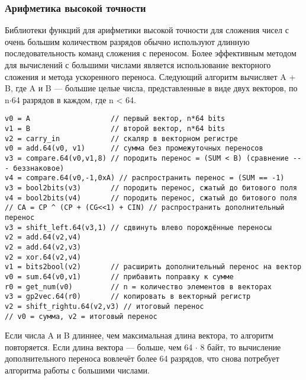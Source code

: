 \documentclass[forwardcom.tex]{subfiles}
\begin{document}
\subsubsection{Арифметика высокой точности} \label{highPrecisionArithmetic}
Библиотеки функций для арифметики высокой точности для сложения чисел с очень большим количеством разрядов обычно используют длинную последовательность команд сложения с переносом. Более эффективным методом для вычислений с большими числами является использование векторного сложения и метода ускоренного переноса. Следующий алгоритм вычисляет A + B, где A и B --- большие целые числа, представленные в виде двух векторов, по n$\cdot$64 разрядов в каждом, где n \textless{} 64.
\begin{verbatim}
v0 = A                   // первый вектор, n*64 bits
v1 = B                   // второй вектор, n*64 bits
v2 = carry_in            // скаляр в векторном регистре
v0 = add.64(v0, v1)      // сумма без промежуточных переносов
v3 = compare.64(v0,v1,8) // породить перенос = (SUM < B) (сравнение --- беззнаковое)
v4 = compare.64(v0,-1,0xA) // распространить перенос = (SUM == -1) 
v3 = bool2bits(v3)       // породить перенос, сжатый до битового поля
v4 = bool2bits(v4)       // породить перенос, сжатый до битового поля
// CA = CP ^ (CP + (CG<<1) + CIN) // распространить дополнительный перенос
v3 = shift_left.64(v3,1) // сдвинуть влево порождённые переносы
v2 = add.64(v2,v4)
v2 = add.64(v2,v3)
v2 = xor.64(v2,v4)
v1 = bits2bool(v2)       // расширить дополнительный перенос на вектор
v0 = sum.64(v0,v1)       // прибавить поправку к сумме
r0 = get_num(v0)         // n = количество элементов в векторах
v3 = gp2vec.64(r0)       // копировать в векторный регистр
v2 = shift_rightu.64(v2,v3) // итоговый перенос
// v0 = сумма, v2 = итоговый перенос
\end{verbatim}

Если числа A и B длиннее, чем максимальная длина вектора, то алгоритм повторяется. Если длина вектора --- больше, чем 64 $\cdot$ 8 байт, то вычисление дополнительного переноса вовлечёт более 64 разрядов, что снова потребует алгоритма работы с большими числами.
\end{document}
